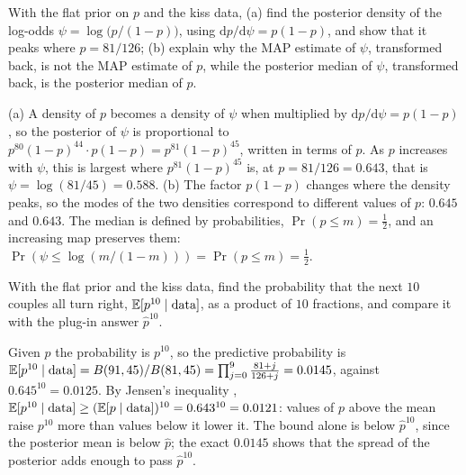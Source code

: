 \begin{exercise}
\label{ex:bayes-map}
With the flat prior on $p$ and the kiss data, (a) find the posterior density of the log-odds $\psi = \log\big(p/(1 - p)\big)$, using $\mathrm{d}p/\mathrm{d}\psi = p(1 - p)$, and show that it peaks where $p = 81/126$; (b) explain why the MAP estimate of $\psi$, transformed back, is not the MAP estimate of $p$, while the posterior median of $\psi$, transformed back, is the posterior median of $p$.
\end{exercise}
\begin{solution}
(a) A density of $p$ becomes a density of $\psi$ when multiplied by $\mathrm{d}p/\mathrm{d}\psi = p(1 - p)$, so the posterior of $\psi$ is proportional to $p^{80}(1 - p)^{44}\cdot p(1 - p) = p^{81}(1 - p)^{45}$, written in terms of $p$. As $p$ increases with $\psi$, this is largest where $p^{81}(1 - p)^{45}$ is, at $p = 81/126 = 0.643$, that is $\psi = \log(81/45) = 0.588$. (b) The factor $p(1 - p)$ changes where the density peaks, so the modes of the two densities correspond to different values of $p$: $0.645$ and $0.643$. The median is defined by probabilities, $\Pr(p \leq m) = \frac12$, and an increasing map preserves them: $\Pr(\psi \leq \log(m/(1 - m))) = \Pr(p \leq m) = \frac12$.
\end{solution}

\begin{exercise}
\label{ex:bayes-predictive}
With the flat prior and the kiss data, find the probability that the next $10$ couples all turn right, $\operatorname*{\mathbb{E}}[p^{10} \mid \text{data}]$, as a product of $10$ fractions, and compare it with the plug-in answer $\hat{p}^{10}$.
\end{exercise}
\begin{solution}
Given $p$ the probability is $p^{10}$, so the predictive probability is $\operatorname*{\mathbb{E}}[p^{10} \mid \text{data}] = B(91, 45)/B(81, 45) = \prod_{j=0}^{9}\frac{81 + j}{126 + j} = 0.0145$, against $0.645^{10} = 0.0125$. By Jensen's inequality , $\operatorname*{\mathbb{E}}[p^{10} \mid \text{data}] \geq (\operatorname*{\mathbb{E}}[p \mid \text{data}])^{10} = 0.643^{10} = 0.0121$: values of $p$ above the mean raise $p^{10}$ more than values below it lower it. The bound alone is below $\hat{p}^{10}$, since the posterior mean is below $\hat{p}$; the exact $0.0145$ shows that the spread of the posterior adds enough to pass $\hat{p}^{10}$.
\end{solution}
